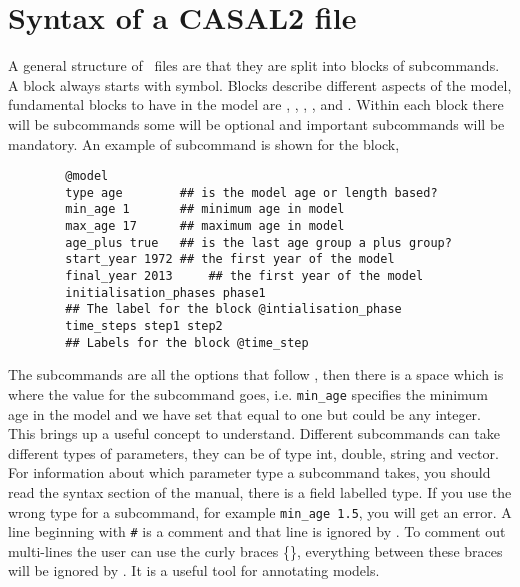 \section{Syntax of a CASAL2 file}\label{Sec:stru}

A general structure of \CNAME\ files are that they are split into blocks of subcommands. A block always starts with \command{} symbol. Blocks describe different aspects of the model, fundamental blocks to have in the model are , , , , and . Within each block there will be subcommands some will be optional and important subcommands will be mandatory. An example of subcommand is shown for the  block,

{\small{\begin{verbatim}
		@model
		type age		## is the model age or length based?
		min_age 1		## minimum age in model
		max_age 17		## maximum age in model
		age_plus true	## is the last age group a plus group?
		start_year 1972	## the first year of the model
		final_year 2013 	## the first year of the model
		initialisation_phases phase1	
		## The label for the block @intialisation_phase
		time_steps step1 step2
		## Labels for the block @time_step
		\end{verbatim}}}
The subcommands are all the options that follow , then there is a space which is where the value for the subcommand goes, i.e. \texttt{min\_age} specifies the minimum age in the model and we have set that equal to one but could be any integer. This brings up a useful concept to understand. Different subcommands can take different types of parameters, they can be of type int, double, string and vector. For information about which parameter type a subcommand takes, you should read the syntax section of the manual, there is a field labelled type. If you use the wrong type for a subcommand, for example \texttt{min\_age 1.5}, you will get an error. A line beginning with \texttt{\#} is a comment and that line is ignored by \CNAME. To comment out multi-lines the user can use the curly braces \{\}, everything between these braces will be ignored by \CNAME. It is a useful tool for annotating models. 

